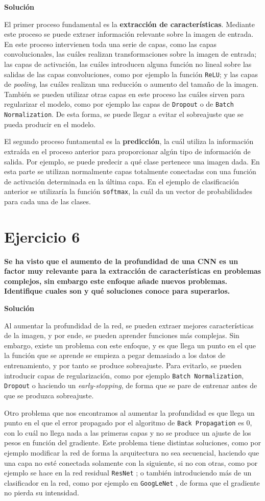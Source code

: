 \documentclass[11pt,a4paper]{article}
\newcommand{\answer}{\noindent\textbf{Solución}}
\newcommand{\question}[1]{\noindent\textbf{#1}}
\newcommand{\nonumsection}[1]{\section*{#1}\addcontentsline{toc}{section}{#1}}
\begin{document}
\answer

El primer proceso fundamental es la \textbf{extracción de características}.
Mediante este proceso se puede extraer información relevante sobre la imagen
de entrada. En este proceso intervienen toda una serie de capas,
como las capas convolucionales, las cuáles realizan transformaciones sobre
la imagen de entrada; las capas de activación, las cuáles
introducen alguna función no lineal sobre las salidas de las
capas convoluciones, como por ejemplo la función \texttt{ReLU}; y las
capas de \textit{pooling}, las cuáles realizan una reducción o aumento
del tamaño de la imagen. También se pueden utilizar otras capas en este
proceso las cuáles sirven para regularizar el modelo, como por ejemplo las capas
de \texttt{Dropout} o de \texttt{Batch Normalization}. De esta forma, se puede
llegar a evitar el sobreajuste que se pueda producir en el modelo.

El segundo proceso funtamental es la \textbf{predicción}, la cuál utiliza
la información extraída en el proceso anterior para proporcionar algún tipo
de información de salida. Por ejemplo, se puede predecir a qué clase pertenece una
imagen dada. En esta parte se utilizan normalmente capas totalmente
conectadas con una función de activación determinada en la última capa. En el
ejemplo de clasificación anterior se utilizaría la función \texttt{softmax},
la cuál da un vector de probabilidades para cada una de las clases.

\nonumsection{Ejercicio 6}

\question{Se ha visto que el aumento de la profundidad de una CNN es un
factor muy relevante para la extracción de características en
problemas complejos, sin embargo este enfoque añade nuevos problemas.
Identifique cuales son y qué soluciones conoce para superarlos.}

\answer

Al aumentar la profundidad de la red, se pueden extraer mejores características
de la imagen, y por ende, se pueden aprender funciones más complejas. Sin
embargo, existe un problema con este enfoque, y es que llega un punto en el
que la función que se aprende se empieza a pegar demasiado a los datos
de entrenamiento, y por tanto se produce sobreajuste. Para evitarlo, se pueden
introducir capas de regularización, como por ejemplo \texttt{Batch Normalization},
\texttt{Dropout} o haciendo un \textit{early-stopping}, de forma que
se pare de entrenar antes de que se produzca sobreajuste.

Otro problema que nos encontramos al aumentar la profundidad es que llega un
punto en el que el error propagado por el algoritmo de \texttt{Back Propagation}
es 0, con lo cuál no llega nada a las primeras capas y no se produce un ajuste
de los pesos en función del gradiente. Este problema tiene distintas soluciones,
como por ejemplo modificar la red de forma
la arquitectura no sea secuencial, haciendo que una capa no esté conectada
solamente con la siguiente, si no con otras, como por ejemplo se hace
en la red residual \texttt{ResNet} \cite{DBLP:journals/corr/HeZRS15};
o también introduciendo más de un clasificador en la red, como por ejemplo
en \texttt{GoogLeNet} \cite{DBLP:journals/corr/SzegedyLJSRAEVR14},
de forma que el gradiente no pierda su intensidad.
\end{document}
